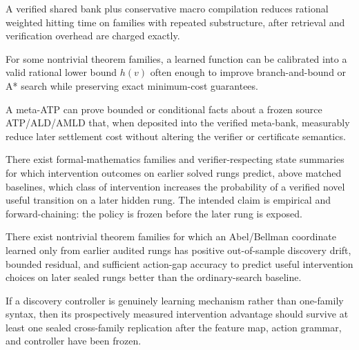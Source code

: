 \begin{conjecture}
A verified shared bank plus conservative macro compilation reduces rational weighted hitting time on families with repeated substructure, after retrieval and verification overhead are charged exactly.
\end{conjecture}

\begin{conjecture}
For some nontrivial theorem families, a learned function can be calibrated into a valid rational lower bound $h(v)$ often enough to improve branch-and-bound or A* search while preserving exact minimum-cost guarantees.
\end{conjecture}

\begin{conjecture}
A meta-ATP can prove bounded or conditional facts about a frozen source ATP/ALD/AMLD that, when deposited into the verified meta-bank, measurably reduce later settlement cost without altering the verifier or certificate semantics.
\end{conjecture}

\begin{conjecture}
There exist formal-mathematics families and verifier-respecting state summaries for which intervention outcomes on earlier solved rungs predict, above matched baselines, which class of intervention increases the probability of a verified novel useful transition on a later hidden rung. The intended claim is empirical and forward-chaining: the policy is frozen before the later rung is exposed.
\end{conjecture}

\begin{conjecture}
There exist nontrivial theorem families for which an Abel/Bellman coordinate learned only from earlier audited rungs has positive out-of-sample discovery drift, bounded residual, and sufficient action-gap accuracy to predict useful intervention choices on later sealed rungs better than the ordinary-search baseline.
\end{conjecture}

\begin{conjecture}
If a discovery controller is genuinely learning mechanism rather than one-family syntax, then its prospectively measured intervention advantage should survive at least one sealed cross-family replication after the feature map, action grammar, and controller have been frozen.
\end{conjecture}

